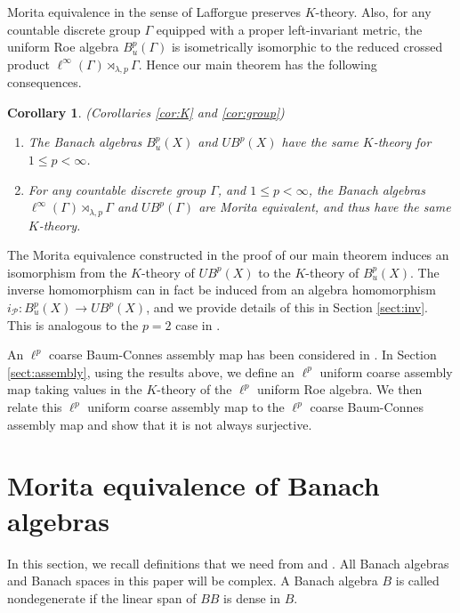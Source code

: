 \documentclass[a4,11pt]{amsart}
\newtheorem{cor}[thm]{Corollary}
\theoremstyle{remark}
\begin{document}
Morita equivalence in the sense of Lafforgue preserves $K$-theory.
Also, for any countable discrete group $\Gamma$ equipped with a proper left-invariant metric, the uniform Roe algebra $B^p_u(\Gamma)$ is isometrically isomorphic to the reduced crossed product $\ell^\infty(\Gamma)\rtimes_{\lambda,p}\Gamma$.
Hence our main theorem has the following consequences.

\begin{cor} (Corollaries \ref{cor:K} and \ref{cor:group})
\begin{enumerate}
\item The Banach algebras $B^p_u(X)$ and $UB^p(X)$ have the same $K$-theory for $1\leq p<\infty$.
\item For any countable discrete group $\Gamma$, and $1\leq p<\infty$, the Banach algebras $\ell^\infty(\Gamma)\rtimes_{\lambda,p}\Gamma$ and $UB^p(\Gamma)$ are Morita equivalent, and thus have the same $K$-theory.
\end{enumerate}
\end{cor}

The Morita equivalence constructed in the proof of our main theorem induces an isomorphism from the $K$-theory of $UB^p(X)$ to the $K$-theory of $B^p_u(X)$.
The inverse homomorphism can in fact be induced from an algebra homomorphism $i_\mathcal{P}:B^p_u(X)\rightarrow UB^p(X)$, and we provide details of this in Section \ref{sect:inv}. This is analogous to the $p=2$ case in \cite[Proposition 4.8]{SW13}.

An $\ell^p$ coarse Baum-Connes assembly map has been considered in \cite{Chung23,SW,ZZ}. 
In Section \ref{sect:assembly}, using the results above, we define an $\ell^p$ uniform coarse assembly map taking values in the $K$-theory of the $\ell^p$ uniform Roe algebra.
We then relate this $\ell^p$ uniform coarse assembly map to the $\ell^p$ coarse Baum-Connes assembly map and show that it is not always surjective.



\section{Morita equivalence of Banach algebras} \label{sect:Mor}

In this section, we recall definitions that we need from \cite{Laf02} and \cite{Par09}.
All Banach algebras and Banach spaces in this paper will be complex.
A Banach algebra $B$ is called nondegenerate if the linear span of $BB$ is dense in $B$.
\end{document}

